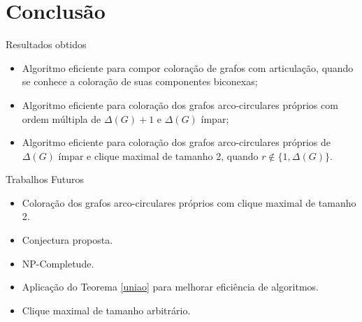 \documentclass[xcolor=table]{beamer}
\theoremstyle{sememph}
\begin{document}
\section{Conclusão}

\begin{frame}{Resultados obtidos}
  \begin{itemize}
    \item Algoritmo eficiente para compor coloração de grafos com
      articulação, quando se conhece a coloração de suas componentes
      biconexas;
    \item Algoritmo eficiente para coloração dos grafos arco-circulares
      próprios com ordem múltipla de $\Delta(G) + 1$ e $\Delta(G)$ ímpar;
    \item Algoritmo eficiente para coloração dos grafos arco-circulares
      próprios de $\Delta(G)$ ímpar e clique maximal de tamanho 2,
      quando $r \not\in \{1, \Delta(G)\}$.
  \end{itemize}
\end{frame}

\begin{frame}{Trabalhos Futuros}
  \begin{itemize}
  \item Coloração dos grafos arco-circulares próprios com clique maximal
    de tamanho 2.
  \item Conjectura proposta.
  \item NP-Completude.
  \item Aplicação do Teorema \ref{uniao} para melhorar eficiência de algoritmos.
  \item Clique maximal de tamanho arbitrário.
  \end{itemize}
\end{frame}
\end{document}
